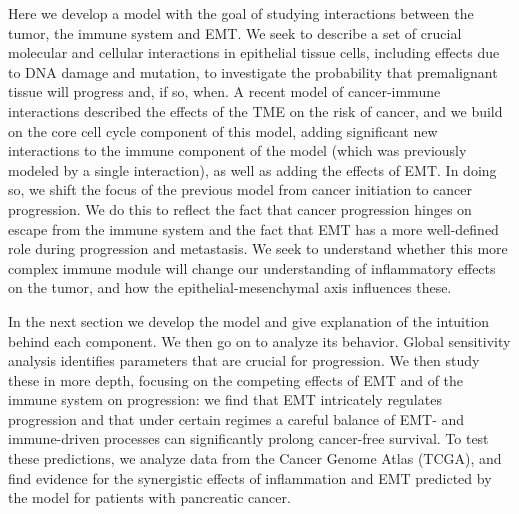 \documentclass[11pt]{article}
\begin{document}
\par
Here we develop a model with the goal of studying interactions between the tumor, the immune system and EMT.
We seek to describe a set of crucial molecular and cellular interactions in epithelial tissue cells, including effects due to DNA damage and mutation, to investigate the probability that premalignant tissue will progress and, if so, when.
A recent model of cancer-immune interactions \cite{guo17_multiscale} described the effects of the TME on the risk of cancer, and we build on the core cell cycle component of this model, adding significant new interactions to the immune component of the model (which was previously modeled by a single interaction), as well as adding the effects of EMT.
In doing so, we shift the focus of the previous model from cancer initiation to cancer progression.
We do this to reflect the fact that cancer progression hinges on escape from the immune system and the fact that EMT has a more well-defined role during progression and metastasis.
We seek to understand whether this more complex immune module will change our understanding of inflammatory effects on the tumor, and how the epithelial-mesenchymal axis influences these.
\par 
In the next section we develop the model and give explanation of the intuition behind each component.
We then go on to analyze its behavior.
Global sensitivity analysis identifies parameters that are crucial for progression.
We then study these in more depth, focusing on the competing effects of EMT and of the immune system on progression: we find that EMT intricately regulates progression and that under certain regimes a careful balance of EMT- and immune-driven processes can significantly prolong cancer-free survival.
To test these predictions, we analyze data from the Cancer Genome Atlas (TCGA), and find evidence for the synergistic effects of inflammation and EMT predicted by the model for patients with pancreatic cancer.

\end{document}

